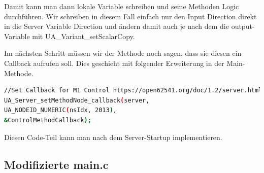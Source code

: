Damit kann man dann lokale Variable schreiben und seine Methoden Logic durchführen. Wir schreiben in diesem Fall einfach nur den Input Direction direkt in die Server Variable Direction und ändern damit auch je nach dem die output-Variable mit UA\_Variant\_setScalarCopy.

Im nächsten Schritt müssen wir der Methode noch sagen, dass sie diesen ein Callback aufrufen soll. Dies geschieht mit folgender Erweiterung in der Main-Methode.

\begin{lstlisting}[language=Bash]
//Set Callback for M1 Control https://open62541.org/doc/1.2/server.html#method-callbacks
UA_Server_setMethodNode_callback(server,
UA_NODEID_NUMERIC(nsIdx, 2013),
&ControlMethodCallback);
\end{lstlisting}
Diesen Code-Teil kann man nach dem Server-Startup implementieren.

\subsection{Modifizierte main.c}

